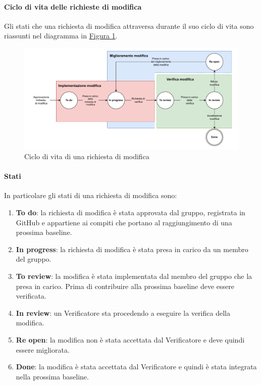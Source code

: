 \paragraph{Ciclo di vita delle richieste di modifica}
\label{par:ciclo_vita_richieste_di_modifica}
Gli stati che una richiesta di modifica attraversa durante il suo ciclo di vita sono riassunti nel diagramma in \hyperref[fig:ciclo_di_vita_modifiche_documenti]{Figura \ref{fig:ciclo_di_vita_modifiche_documenti}}.
\begin{figure}[h!]
    \center
    \includegraphics[scale=0.6]{Sezioni/ProcessiDiSupporto/Immagini/lifecycle_modifica.pdf}
    \caption{Ciclo di vita di una richiesta di modifica}
    \label{fig:ciclo_di_vita_modifiche_documenti}
\end{figure}

\paragraph{Stati}\label{par:stati}
In particolare gli stati di una richiesta di modifica sono:
\begin{enumerate}
    \item \textbf{To do}: la richiesta di modifica è stata approvata dal gruppo, registrata in GitHub e appartiene ai compiti che portano al raggiungimento di una prossima baseline.
    \item \textbf{In progress}: la richiesta di modifica è stata presa in carico da un membro del gruppo.
    \item \textbf{To review}: la modifica è stata implementata dal membro del gruppo che la presa in carico.
    Prima di contribuire alla prossima baseline deve essere verificata.
    \item \textbf{In review}: un Verificatore sta procedendo a eseguire la verifica della modifica.
    \item \textbf{Re open}: la modifica non è stata accettata dal Verificatore e deve quindi essere migliorata.
    \item \textbf{Done}: la modifica è stata accettata dal Verificatore e quindi è stata integrata nella prossima baseline. 
\end{enumerate}

